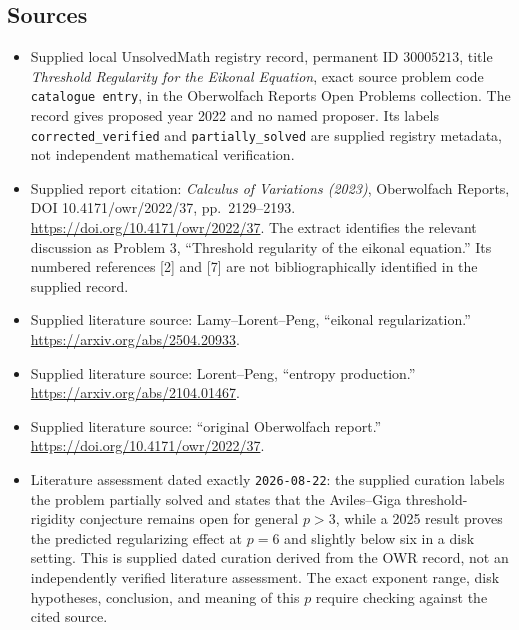 \documentclass[11pt]{article}
\begin{document}
\subsection{Sources}
\begin{itemize}
\item Supplied local UnsolvedMath registry record, permanent ID \(30005213\), title \emph{Threshold Regularity for the Eikonal Equation}, exact source problem code \texttt{catalogue entry}, in the Oberwolfach Reports Open Problems collection. The record gives proposed year 2022 and no named proposer. Its labels \texttt{corrected\_verified} and \texttt{partially\_solved} are supplied registry metadata, not independent mathematical verification.
\item Supplied report citation: \emph{Calculus of Variations (2023)}, Oberwolfach Reports, DOI 10.4171/owr/2022/37, pp.\ 2129--2193. \url{https://doi.org/10.4171/owr/2022/37}. The extract identifies the relevant discussion as Problem 3, ``Threshold regularity of the eikonal equation.'' Its numbered references [2] and [7] are not bibliographically identified in the supplied record.
\item Supplied literature source: Lamy--Lorent--Peng, ``eikonal regularization.'' \url{https://arxiv.org/abs/2504.20933}.
\item Supplied literature source: Lorent--Peng, ``entropy production.'' \url{https://arxiv.org/abs/2104.01467}.
\item Supplied literature source: ``original Oberwolfach report.'' \url{https://doi.org/10.4171/owr/2022/37}.
\item Literature assessment dated exactly \texttt{2026-08-22}: the supplied curation labels the problem partially solved and states that the Aviles--Giga threshold-rigidity conjecture remains open for general \(p>3\), while a 2025 result proves the predicted regularizing effect at \(p=6\) and slightly below six in a disk setting. This is supplied dated curation derived from the OWR record, not an independently verified literature assessment. The exact exponent range, disk hypotheses, conclusion, and meaning of this \(p\) require checking against the cited source.
\end{itemize}
\end{document}
